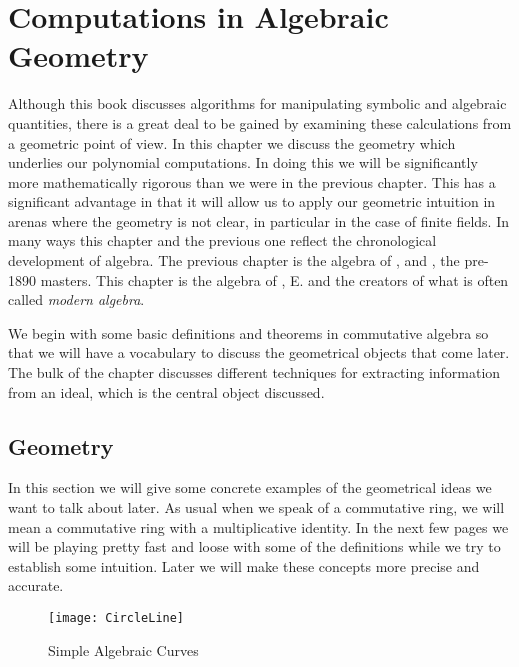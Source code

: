 \chapter{Computations in Algebraic Geometry}
\label{Geometry:Chap}


Although this book discusses algorithms for manipulating symbolic and
algebraic quantities, there is a great deal to be gained by examining
these calculations from a geometric point of view.  In this chapter we
discuss the geometry which underlies our polynomial computations.  In
doing this we will be significantly more mathematically rigorous than
we were in the previous chapter.  This has a significant advantage in
that it will allow us to apply our geometric intuition in arenas where
the geometry is not clear, in particular in the case of finite fields.
In many ways this chapter and the previous one reflect the
chronological development of algebra.  The previous chapter is the
algebra of {\Cayley}, {\Sylvester} and {\Gordan}, the pre-1890 masters.
This chapter is the algebra of {\Hilbert}, E. {\NoetherE} and
{\Waerden} the creators of what is often called {\em modern
algebra\/}.

We begin with some basic definitions and theorems in commutative algebra
so that we will have a vocabulary to discuss the geometrical objects
that come later.  The bulk of the chapter discusses different techniques
for extracting information from an ideal, which is the central object
discussed.


\section{Geometry}
\label{Geometry:Sec}

In this section we will give some concrete examples of the geometrical
ideas we want to talk about later.  As usual when we speak of a
commutative ring, we will mean a commutative ring with a
multiplicative identity.  In the next few pages we will be playing
pretty fast and loose with some of the definitions while we try to
establish some intuition.  Later we will make these concepts more
precise and accurate.

\begin{figure}
\begin{center}
\texttt{[image: CircleLine]}
\end{center}
\caption{Simple Algebraic Curves\label{Circle:Fig}}
\end{figure}

